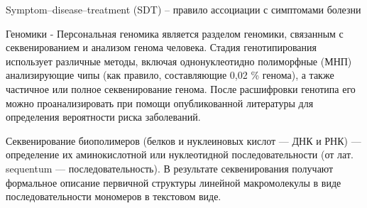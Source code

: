 Symptom–disease–treatment (SDT) -- правило ассоциации с симптомами болезни

Геномики - Персональная геномика является разделом геномики, связанным с секвенированием и анализом генома человека. Стадия генотипирования использует различные методы, включая однонуклеотидно полиморфные (МНП) анализирующие чипы (как правило, составляющие 0,02 \% генома), а также частичное или полное секвенирование генома. После расшифровки генотипа его можно проанализировать при помощи опубликованной литературы для определения вероятности риска заболеваний.

Секвенирование биополимеров (белков и нуклеиновых кислот — ДНК и РНК) — определение их аминокислотной или нуклеотидной последовательности (от лат. sequentum — последовательность). В результате секвенирования получают формальное описание первичной структуры линейной макромолекулы в виде последовательности мономеров в текстовом виде. 
